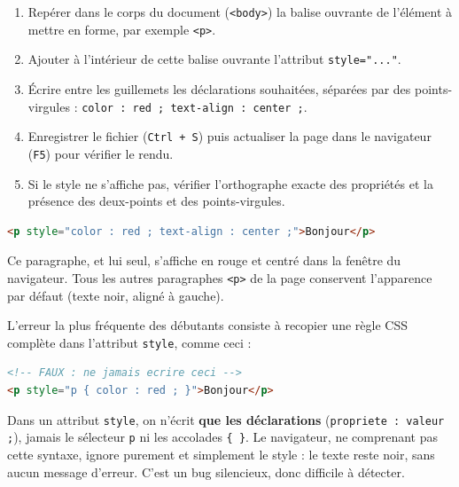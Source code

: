 \documentclass[11pt]{article}
\begin{document}
\begin{methode}
\begin{enumerate}
    \item Repérer dans le corps du document (\texttt{<body>}) la balise ouvrante de l'élément à mettre en forme, par exemple \texttt{<p>}.
    \item Ajouter à l'intérieur de cette balise ouvrante l'attribut \texttt{style="..."}.
    \item Écrire entre les guillemets les déclarations souhaitées, séparées par des points-virgules : \texttt{color : red ; text-align : center ;}.
    \item Enregistrer le fichier (\texttt{Ctrl + S}) puis actualiser la page dans le navigateur (\texttt{F5}) pour vérifier le rendu.
    \item Si le style ne s'affiche pas, vérifier l'orthographe exacte des propriétés et la présence des deux-points et des points-virgules.
\end{enumerate}
\end{methode}

\begin{exemplebox}
\begin{lstlisting}[language=HTML]
<p style="color : red ; text-align : center ;">Bonjour</p>
\end{lstlisting}
Ce paragraphe, et lui seul, s'affiche en rouge et centré dans la fenêtre du navigateur. Tous les autres paragraphes \texttt{<p>} de la page conservent l'apparence par défaut (texte noir, aligné à gauche).
\end{exemplebox}

\begin{attention}
L'erreur la plus fréquente des débutants consiste à recopier une règle CSS complète dans l'attribut \texttt{style}, comme ceci :
\begin{lstlisting}[language=HTML]
<!-- FAUX : ne jamais ecrire ceci -->
<p style="p { color : red ; }">Bonjour</p>
\end{lstlisting}
Dans un attribut \texttt{style}, on n'écrit \textbf{que les déclarations} (\texttt{propriete : valeur ;}), jamais le sélecteur \texttt{p} ni les accolades \texttt{\{ \}}. Le navigateur, ne comprenant pas cette syntaxe, ignore purement et simplement le style : le texte reste noir, sans aucun message d'erreur. C'est un bug silencieux, donc difficile à détecter.
\end{attention}
\end{document}
